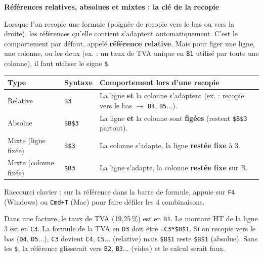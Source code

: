 \documentclass[11pt]{article}
\begin{document}
\textbf{Références relatives, absolues et mixtes : la clé de la recopie}\par

Lorsque l'on recopie une formule (poignée de recopie vers le bas ou vers la droite), les références qu'elle contient s'adaptent automatiquement. C'est le comportement par défaut, appelé \textbf{référence relative}. Mais pour figer une ligne, une colonne, ou les deux (ex. : un taux de TVA unique en \texttt{B1} utilisé par toute une colonne), il faut utiliser le signe \texttt{\$}.

\begin{propriete}
\begin{center}
\begin{tabularx}{\linewidth}{|l|l|X|}
\hline
\rowcolor{popblueL} \textbf{Type} & \textbf{Syntaxe} & \textbf{Comportement lors d'une recopie} \\
\hline
Relative & \texttt{B3} & La ligne \textbf{et} la colonne s'adaptent (ex. : recopie vers le bas $\rightarrow$ \texttt{B4}, \texttt{B5}...). \\
\hline
Absolue & \texttt{\$B\$3} & La ligne \textbf{et} la colonne sont \textbf{figées} (restent \texttt{\$B\$3} partout). \\
\hline
Mixte (ligne fixée) & \texttt{B\$3} & La colonne s'adapte, la ligne \textbf{restée fixe} à 3. \\
\hline
Mixte (colonne fixée) & \texttt{\$B3} & La ligne s'adapte, la colonne \textbf{restée fixe} sur B. \\
\hline
\end{tabularx}
\end{center}
Raccourci clavier : sur la référence dans la barre de formule, appuie sur \texttt{F4} (Windows) ou \texttt{Cmd+T} (Mac) pour faire défiler les 4 combinaisons.
\end{propriete}

\begin{exemplebox}
Dans une facture, le taux de TVA (19,25\,\%) est en \texttt{B1}. Le montant HT de la ligne 3 est en \texttt{C3}. La formule de la TVA en \texttt{D3} doit être \texttt{=C3*\$B\$1}. Si on recopie vers le bas (\texttt{D4}, \texttt{D5}...), \texttt{C3} devient \texttt{C4}, \texttt{C5}... (relative) mais \texttt{\$B\$1} reste \texttt{\$B\$1} (absolue). Sans les \texttt{\$}, la référence glisserait vers \texttt{B2}, \texttt{B3}... (vides) et le calcul serait faux.
\end{exemplebox}
\end{document}
